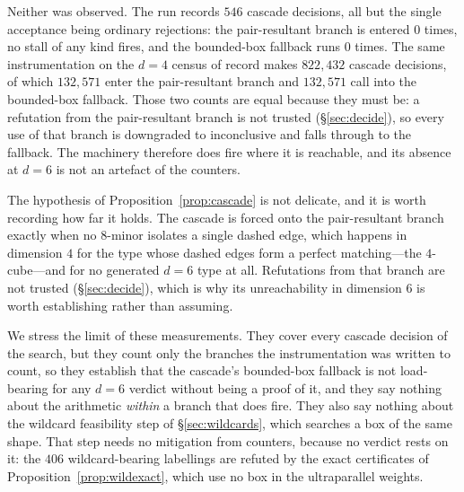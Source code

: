 \documentclass[11pt,reqno]{amsart}
\theoremstyle{plain}
\theoremstyle{definition}
\newcommand{\DFourCascade}{822{,}432}
\newcommand{\DFourPair}{132{,}571}
\newcommand{\DFourFallback}{132{,}571}
\newcommand{\NumCascade}{546}
\newcommand{\NumWild}{406}
\begin{document}
Neither was observed. The run records $\NumCascade$ cascade decisions, all but the
single acceptance being ordinary rejections: the pair-resultant branch is entered
$0$ times, no stall of any kind fires, and the bounded-box fallback runs $0$ times.
The same instrumentation on the $d=4$ census of record makes $\DFourCascade$
cascade decisions, of which $\DFourPair$ enter the pair-resultant branch and
$\DFourFallback$ call into the bounded-box fallback. Those two counts are equal
because they must be: a refutation from the pair-resultant branch is not trusted
(\S\ref{sec:decide}), so every use of that branch is downgraded to inconclusive
and falls through to the fallback. The machinery therefore does fire where it is
reachable, and its absence at $d=6$ is not an artefact of the counters.

The hypothesis of Proposition~\ref{prop:cascade} is not delicate, and it is worth
recording how far it holds. The cascade is forced onto the pair-resultant branch
exactly when no $8$-minor isolates a single dashed edge, which happens in dimension
$4$ for the type whose dashed edges form a perfect matching---the $4$-cube---and for
no generated $d=6$ type at all. Refutations from that branch are not trusted
(\S\ref{sec:decide}), which is why its unreachability in dimension $6$ is worth
establishing rather than assuming.

We stress the limit of these measurements. They cover every cascade decision of
the search, but they count only the branches the instrumentation was written to
count, so they establish that the cascade's bounded-box fallback is not load-bearing
for any $d=6$ verdict without being a proof of it, and they say nothing about the
arithmetic \emph{within} a branch that does fire. They also say nothing about the wildcard feasibility step of
\S\ref{sec:wildcards}, which searches a box of the same shape. That step needs no
mitigation from counters, because no verdict rests on it: the $\NumWild$
wildcard-bearing labellings are refuted by the exact certificates of
Proposition~\ref{prop:wildexact}, which use no box in the ultraparallel weights.



\end{document}
